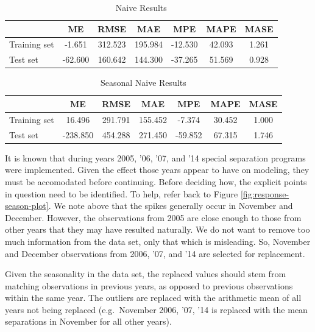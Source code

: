 \documentclass[12pt,letterpaper,toc=flat,oneside]{report}
\theoremstyle{definition}
\theoremstyle{definition}
\theoremstyle{definition}
\theoremstyle{remark}
\begin{document}
\begin{table}[!h]

\caption{\label{tab:n-err}Naive Results}
\centering
\begin{tabular}[t]{lcccccc}
\toprule
\bfseries{ } & \bfseries{ME} & \bfseries{RMSE} & \bfseries{MAE} & \bfseries{MPE} & \bfseries{MAPE} & \bfseries{MASE}\\
\midrule
Training set & -1.651 & 312.523 & 195.984 & -12.530 & 42.093 & 1.261\\
Test set & -62.600 & 160.642 & 144.300 & -37.265 & 51.569 & 0.928\\
\bottomrule
\end{tabular}
\end{table}\begin{table}[!h]

\caption{\label{tab:sn-err}Seasonal Naive Results}
\centering
\begin{tabular}[t]{lcccccc}
\toprule
\bfseries{ } & \bfseries{ME} & \bfseries{RMSE} & \bfseries{MAE} & \bfseries{MPE} & \bfseries{MAPE} & \bfseries{MASE}\\
\midrule
Training set & 16.496 & 291.791 & 155.452 & -7.374 & 30.452 & 1.000\\
Test set & -238.850 & 454.288 & 271.450 & -59.852 & 67.315 & 1.746\\
\bottomrule
\end{tabular}
\end{table}

It is known that during years 2005, '06, '07, and '14 special separation
programs were implemented. Given the effect those years appear to have
on modeling, they must be accomodated before continuing. Before deciding
how, the explicit points in question need to be identified. To help,
refer back to Figure \ref{fig:response-season-plot}. We note above that
the spikes generally occur in November and December. However, the
observations from 2005 are close enough to those from other years that
they may have resulted naturally. We do not want to remove too much
information from the data set, only that which is misleading. So,
November and December observations from 2006, '07, and '14 are selected
for replacement.

Given the seasonality in the data set, the replaced values should stem
from matching observations in previous years, as opposed to previous
observations within the same year. The outliers are replaced with the
arithmetic mean of all years not being replaced (e.g.~November 2006,
'07, '14 is replaced with the mean separations in November for all other
years).
\end{document}
